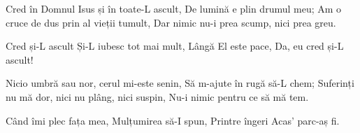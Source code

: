 \beginverse
Cred în Domnul Isus și în toate-L ascult,
De lumină e plin drumul meu;
Am o cruce de dus prin al vieții tumult,
Dar nimic nu-i prea scump, nici prea greu.
\endverse

\beginchorus
Cred și-L ascult
Și-L iubesc tot mai mult,
Lângă El este pace,
Da, eu cred și-L ascult!
\endchorus

\beginverse
Nicio umbră sau nor, cerul mi-este senin,
Să m-ajute în rugă să-L chem;
Suferinți nu mă dor, nici nu plâng, nici suspin,
Nu-i nimic pentru ce să mă tem.
\endverse

\beginverse
Când îmi plec fața mea,
Mulțumirea să-I spun,
Printre îngeri
Acas' parc-aș fi.
\endverse
\endsong
